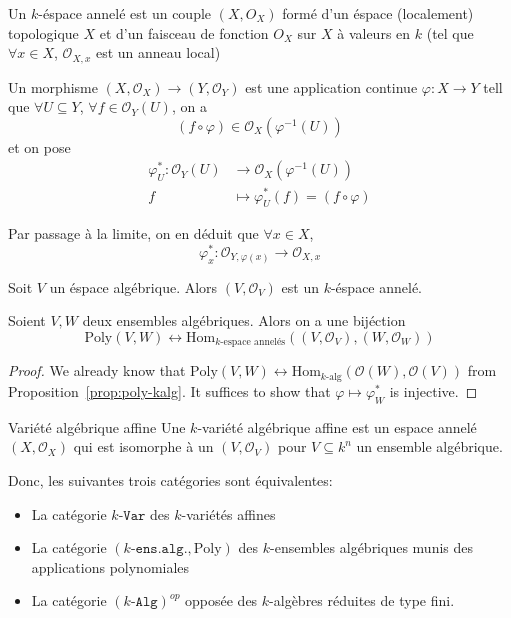 \begin{definition}{}
    Un \(k\)-éspace annelé est un couple \({(X, O_X)}\) formé d'un éspace
    (localement)
    topologique \(X\) et d'un faisceau de fonction \(O_X\) sur \(X\) à valeurs
    en \(k\) (tel que \(\forall x \in X\), \(\mathcal{O}_{X, x} \) est un anneau
    local)

    Un morphisme \({(X, \mathcal{O}_X)} \to {(Y, \mathcal{O}_Y)}\) est une
    application continue \(\varphi : X \to Y\) tell que \(\forall U \subseteq Y \),
    \(\forall f \in \mathcal{O}_Y{(U)}\), on a 
    \[
      {(f \circ \varphi )} \in \mathcal{O}_X{(\varphi ^{-1}{(U)})}
    \]
    et on pose
    \begin{align*}
        \varphi ^{*}_U: \mathcal{O}_Y{(U)} &\longrightarrow
        \mathcal{O}_X{(\varphi ^{-1}{(U)})} \\
        f &\longmapsto \varphi ^{*}_U(f) = {(f \circ \varphi )}
    \end{align*}
\end{definition}

Par passage à la limite, on en déduit que \(\forall x \in X\),
\[
  \varphi^{*}_x : \mathcal{O}_{Y, \varphi {(x)}} \to \mathcal{O}_{X, x} 
\]

Soit \(V\) un éspace algébrique. Alors \({(V, \mathcal{O}_V)}\) est un
\(k\)-éspace annelé.

\begin{lemma}{}
    Soient \(V, W\) deux ensembles algébriques. Alors on a une bijéction
    \[
      \mathrm{Poly}{(V, W)} \longleftrightarrow \mathrm{Hom}_{k\text{-espace
      annelés}} {({(V, \mathcal{O}_V)}, {(W, \mathcal{O}_W)})}
    \]
\end{lemma}

\begin{proof}{}
    We already know that \(\mathrm{Poly}{(V, W)} \leftrightarrow
    \mathrm{Hom}_{k\text{-alg}} {(\mathcal{O}{(W)}, \mathcal{O}{(V)})}\) from
    Proposition~\ref{prop:poly-kalg}. It suffices to show that \(\varphi \mapsto
    \varphi _W^{*}\) is injective.
\end{proof}

\begin{definition}{Variété algébrique affine}
    Une \(k\)-variété algébrique affine est un espace annelé \({(X,
    \mathcal{O}_X)}\) qui est isomorphe à un \({(V, \mathcal{O}_V)}\) pour \(V
    \subseteq k^{n} \) un ensemble algébrique.
\end{definition}

Donc, les suivantes trois catégories sont équivalentes:
\begin{itemize}[label=\bullet]
    \item La catégorie \(k\text{-}\mathtt{Var}\) des \(k\)-variétés affines
    \item La catégorie \({(k\text{-}\mathtt{ens.alg.}, \mathrm{Poly})}\) des
        \(k\)-ensembles algébriques munis des applications polynomiales
    \item La catégorie \({(k\text{-}\mathtt{Alg})}^{op}\) opposée des
        \(k\)-algèbres réduites de type fini.
\end{itemize}

